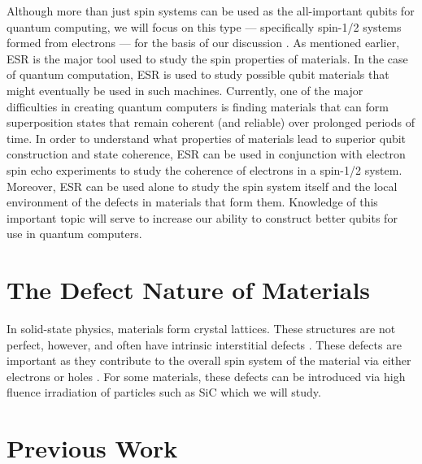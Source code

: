 \documentclass[oneside, noacknowlegments]{BYUPhys}
\begin{document}
Although more than just spin systems can be used as the all-important qubits for quantum computing, we will focus on this type --- specifically spin-1/2 systems formed from electrons --- for the basis of our discussion \cite{RefWorks:doc:58929612e4b0499fa95c50fa}. As mentioned earlier, ESR is the major tool used to study the spin properties of materials. In the case of quantum computation, ESR is used to study possible qubit materials that might eventually be used in such machines. Currently, one of the major difficulties in creating quantum computers is finding materials that can form superposition states that remain coherent (and reliable) over prolonged periods of time. In order to understand what properties of materials lead to superior qubit construction and state coherence, ESR can be used in conjunction with electron spin echo experiments to study the coherence of electrons in a spin-1/2 system. Moreover, ESR can be used alone to study the spin system itself and the local environment of the defects in materials that form them. Knowledge of this important topic will serve to increase our ability to construct better qubits for use in quantum computers.

\section{The Defect Nature of Materials}

In solid-state physics, materials form crystal lattices. These structures are not perfect, however, and often have intrinsic interstitial defects \cite{RefWorks:doc:58929264e4b0d4c09201f63b}. These defects are important as they contribute to the overall spin system of the material via either electrons or holes \cite{RefWorks:doc:58929816e4b0499fa95c51a6}. For some materials, these defects can be introduced via high fluence irradiation of particles such as SiC which we will study.

\section{Previous Work}
\end{document}
